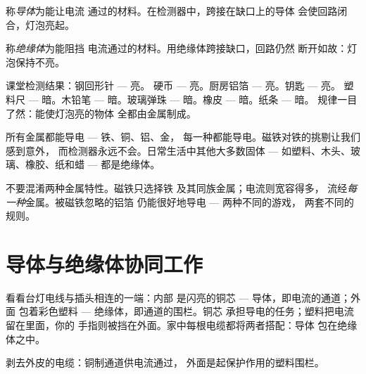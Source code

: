 \begin{definition}[导体]\label{def:g4:conductors-insulators:conductor}
称\emph{导体}为能让电流
通过的材料。在检测器中，跨接在缺口上的导体
会使回路闭合，灯泡亮起。
\end{definition}

\begin{definition}[绝缘体]\label{def:g4:conductors-insulators:insulator}
称\emph{绝缘体}为能阻挡
电流通过的材料。用绝缘体跨接缺口，回路仍然
断开如故：灯泡保持不亮。
\end{definition}

\begin{example}[一上午的测试]\label{ex:g4:conductors-insulators:trials}
课堂检测结果：钢回形针 --- 亮。
硬币 --- 亮。厨房铝箔 --- 亮。钥匙 --- 亮。
塑料尺 --- 暗。木铅笔 --- 暗。玻璃弹珠
--- 暗。橡皮 --- 暗。纸条 --- 暗。
规律一目了然：能使灯泡亮的物体
全都由金属制成。
\end{example}

\begin{proposition}[金属导电]\label{prop:g4:conductors-insulators:metals}
所有金属都能导电 --- 铁、铜、铝、金，
每一种都能导电。磁铁对铁的挑剔让我们感到意外，
而检测器永远不会。日常生活中其他大多数固体 ---
如塑料、木头、玻璃、橡胶、纸和蜡 --- 都是绝缘体。
\end{proposition}

\begin{remark}[导体并不都有磁性]\label{rem:g4:conductors-insulators:notmagnet}
不要混淆两种金属特性。磁铁只选择铁
及其同族金属；电流则宽容得多，
流经\emph{每一种}金属。被磁铁忽略的铝箔
仍能很好地导电 --- 两种不同的游戏，
两套不同的规则。
\end{remark}

\section{导体与绝缘体协同工作}

\begin{example}[导线的构造]\label{ex:g4:conductors-insulators:wire}
看看台灯电线与插头相连的一端：内部
是闪亮的铜芯 --- 导体，即电流的通道；外面
包着彩色塑料 --- 绝缘体，即通道的围栏。铜芯
承担导电的任务；塑料把电流留在里面，你的
手指则被挡在外面。家中每根电缆都将两者搭配：导体
包在绝缘体之中。
\end{example}

\begin{omfigure}

{\small 剥去外皮的电缆：铜制通道供电流通过，
外面是起保护作用的塑料围栏。}
\end{omfigure}

